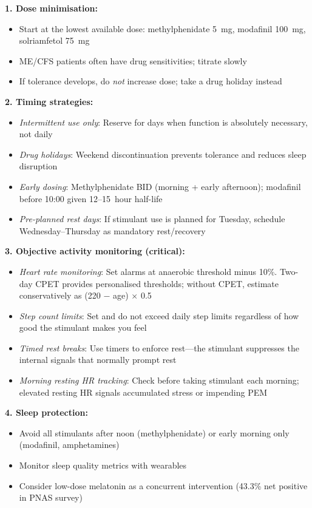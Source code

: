\begin{protocol}
\label{prot:stimulant-harm-reduction}

\textbf{1. Dose minimisation:}
\begin{itemize}
    \item Start at the lowest available dose: methylphenidate 5~mg, modafinil 100~mg, solriamfetol 75~mg
    \item ME/CFS patients often have drug sensitivities; titrate slowly
    \item If tolerance develops, do \textit{not} increase dose; take a drug holiday instead
\end{itemize}

\textbf{2. Timing strategies:}
\begin{itemize}
    \item \textit{Intermittent use only}: Reserve for days when function is absolutely necessary, not daily
    \item \textit{Drug holidays}: Weekend discontinuation prevents tolerance and reduces sleep disruption
    \item \textit{Early dosing}: Methylphenidate BID (morning + early afternoon); modafinil before 10:00 given 12--15~hour half-life
    \item \textit{Pre-planned rest days}: If stimulant use is planned for Tuesday, schedule Wednesday--Thursday as mandatory rest/recovery
\end{itemize}

\textbf{3. Objective activity monitoring (critical):}
\begin{itemize}
    \item \textit{Heart rate monitoring}: Set alarms at anaerobic threshold minus 10\%. Two-day CPET provides personalised thresholds; without CPET, estimate conservatively as (220 $-$ age) $\times$ 0.5
    \item \textit{Step count limits}: Set and do not exceed daily step limits regardless of how good the stimulant makes you feel
    \item \textit{Timed rest breaks}: Use timers to enforce rest---the stimulant suppresses the internal signals that normally prompt rest
    \item \textit{Morning resting HR tracking}: Check before taking stimulant each morning; elevated resting HR signals accumulated stress or impending PEM
\end{itemize}

\textbf{4. Sleep protection:}
\begin{itemize}
    \item Avoid all stimulants after noon (methylphenidate) or early morning only (modafinil, amphetamines)
    \item Monitor sleep quality metrics with wearables
    \item Consider low-dose melatonin as a concurrent intervention (43.3\% net positive in PNAS survey)~\cite{Vernon2025PNAS}
\end{itemize}


\end{protocol}
